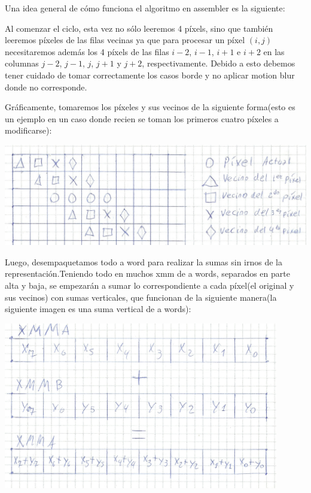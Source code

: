 \documentclass[a4paper]{article}
\begin{document}
Una idea general de cómo funciona el algoritmo en assembler es la siguiente:

Al comenzar el ciclo, esta vez no sólo leeremos 4 píxels, sino que también leeremos píxeles de las filas vecinas ya que para procesar un píxel $(i,j)$ necesitaremos además los 4 píxels de las filas $i-2$, $i-1$, $i+1$ e $i+2$ en las columnas $j-2$, $j-1$, $j$, $j+1$ y $j+2$, respectivamente. Debido a esto debemos tener cuidado de tomar correctamente los casos borde y no aplicar motion blur donde no corresponde.

Gráficamente, tomaremos los píxeles y sus vecinos de la siguiente forma(esto es un ejemplo en un caso donde recien se toman los primeros cuatro píxeles a modificarse):

\begin{center}
\includegraphics[scale=0.66]{Dibujos/MB1.jpg}
\end{center}

Luego, desempaquetamos todo a word para realizar la sumas sin irnos de la representación.Teniendo todo en muchos xmm de a words, separados en parte alta y baja, se empezarán a sumar lo correspondiente a cada píxel(el original y sus vecinos) con sumas verticales, que funcionan de la siguiente manera(la siguiente imagen es una suma vertical de a words):

\begin{center}
\includegraphics[width=0.9\textwidth]{Dibujos/sv.jpg}
\end{center}
\end{document}
